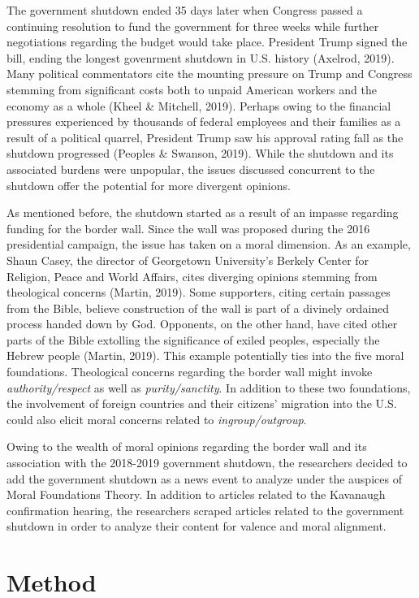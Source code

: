 \documentclass[english,,man]{apa6}
\begin{document}
The government shutdown ended 35 days later when Congress passed a continuing resolution to fund the government for three weeks while further negotiations regarding the budget would take place. President Trump signed the bill, ending the longest govenrment shutdown in U.S. history (Axelrod, 2019). Many political commentators cite the mounting pressure on Trump and Congress stemming from significant costs both to unpaid American workers and the economy as a whole (Kheel \& Mitchell, 2019). Perhaps owing to the financial pressures experienced by thousands of federal employees and their families as a result of a political quarrel, President Trump saw his approval rating fall as the shutdown progressed (Peoples \& Swanson, 2019). While the shutdown and its associated burdens were unpopular, the issues discussed concurrent to the shutdown offer the potential for more divergent opinions.

As mentioned before, the shutdown started as a result of an impasse regarding funding for the border wall. Since the wall was proposed during the 2016 presidential campaign, the issue has taken on a moral dimension. As an example, Shaun Casey, the director of Georgetown University's Berkely Center for Religion, Peace and World Affairs, cites diverging opinions stemming from theological concerns (Martin, 2019). Some supporters, citing certain passages from the Bible, believe construction of the wall is part of a divinely ordained process handed down by God. Opponents, on the other hand, have cited other parts of the Bible extolling the significance of exiled peoples, especially the Hebrew people (Martin, 2019). This example potentially ties into the five moral foundations. Theological concerns regarding the border wall might invoke \emph{authority/respect} as well as \emph{purity/sanctity}. In addition to these two foundations, the involvement of foreign countries and their citizens' migration into the U.S. could also elicit moral concerns related to \emph{ingroup/outgroup}.

Owing to the wealth of moral opinions regarding the border wall and its association with the 2018-2019 government shutdown, the researchers decided to add the government shutdown as a news event to analyze under the auspices of Moral Foundations Theory. In addition to articles related to the Kavanaugh confirmation hearing, the researchers scraped articles related to the government shutdown in order to analyze their content for valence and moral alignment.

\hypertarget{method-1}{%
\section{Method}\label{method-1}}
\end{document}

